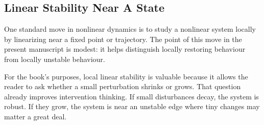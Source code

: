 \subsection{Linear Stability Near A State}

One standard move in nonlinear dynamics is to study a nonlinear system locally
by linearizing near a fixed point or trajectory. The point of this move in the
present manuscript is modest: it helps distinguish locally restoring behaviour
from locally unstable behaviour.

\begin{remark}
For the book's purposes, local linear stability is valuable because it allows
the reader to ask whether a small perturbation shrinks or grows. That question
already improves intervention thinking. If small disturbances decay, the system
is robust. If they grow, the system is near an unstable edge where tiny changes
may matter a great deal.
\end{remark}
